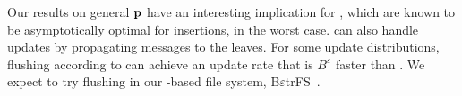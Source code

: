 Our results on general $\mathbf{p}$ have an interesting implication for \betrees{},
which are known to be asymptotically optimal for insertions, in the worst case.
\betrees{} can also handle updates by propagating messages to the leaves.  For
some update distributions, flushing according to \RB can achieve an update rate
that is $B^\varepsilon$ faster than \FB.  We expect to try \RB flushing in our
\betree{}-based file system,
B$\varepsilon$trFS~\cite{JannenYuZh15a,YuanZhJa16,YuanZhJa17,ConwayBa17,JannenYuZh15,esmet2012tokufs}.


